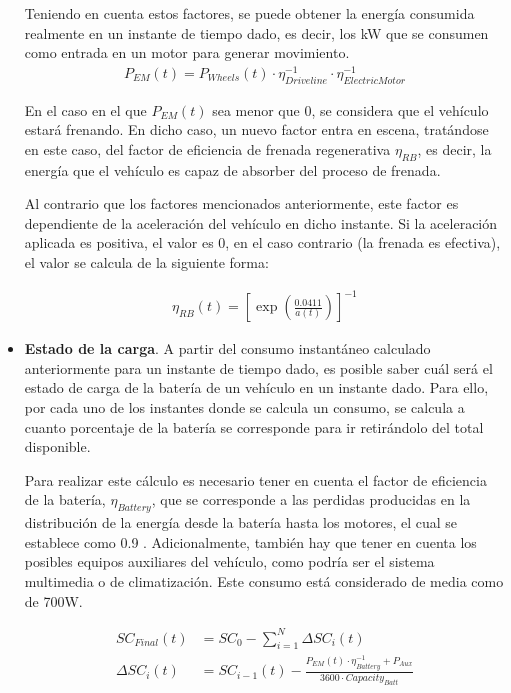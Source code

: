 \documentclass[11pt,spanish,listoffigures,listoftables]{tfgetsinf}
\begin{document}
\begin{itemize}
    Teniendo en cuenta estos factores, se puede obtener la energía consumida realmente en un instante de tiempo dado, es decir, los kW que se consumen como entrada en un motor para generar movimiento.
    \begin{align*}
        P_{EM}(t) = P_{Wheels}(t) \cdot \eta_{Driveline}^{-1} \cdot \eta_{Electric Motor}^{-1}
    \end{align*}
    
    En el caso en el que $P_{EM}(t)$ sea menor que 0, se considera que el vehículo estará frenando. En dicho caso, un nuevo factor entra en escena, tratándose en este caso, del factor de eficiencia de frenada regenerativa $\eta_{RB}$, es decir, la energía que el vehículo es capaz de absorber del proceso de frenada.
    
    Al contrario que los factores mencionados anteriormente, este factor es dependiente de la aceleración del vehículo en dicho instante. Si la aceleración aplicada es positiva, el valor es 0, en el caso contrario (la frenada es efectiva), el valor se calcula de la siguiente forma:
    
    \begin{align*}
        \eta_{RB}(t) = \left[ \exp \left( \frac{0.0411}{a(t)} \right) \right] ^{-1}
    \end{align*}
    
    \item \textbf{Estado de la carga}.
    A partir del consumo instantáneo calculado anteriormente para un instante de tiempo dado, es posible saber cuál será el estado de carga de la batería de un vehículo en un instante dado. Para ello, por cada uno de los instantes donde se calcula un consumo, se calcula a cuanto porcentaje de la batería se corresponde para ir retirándolo del total disponible. 
    
    Para realizar este cálculo es necesario tener en cuenta el factor de eficiencia de la batería, $\eta_{Battery}$, que se corresponde a las perdidas producidas en la distribución de la energía desde la batería hasta los motores, el cual se establece como 0.9 \cite{RYDH20051957}. Adicionalmente, también hay que tener en cuenta los posibles equipos auxiliares del vehículo, como podría ser el sistema multimedia o de climatización. Este consumo está considerado de media como de 700W.
    
    \begin{align*}
        SC_{Final}(t) &= SC_{0} - \sum_{i=1}^{N}{\Delta SC_{i}(t)} \\
        \Delta SC_{i}(t) &= SC_{i-1}(t) - \frac{P_{EM}(t) \cdot \eta_{Battery}^{-1} + P_{Aux}}{3600 \cdot Capacity_{Batt}}
    \end{align*}
    

\end{itemize}
\end{document}
